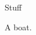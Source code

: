 \documentclass{article}
\begin{document}
\begin{figure}
    Stuff
    \caption{A boat.}
  \end{figure}
\end{document}
